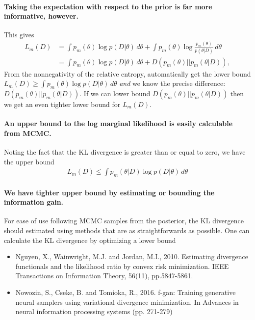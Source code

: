 \documentclass[10pt,a4paper]{article}
\begin{document}
\paragraph{Taking the expectation with respect to the prior is far more informative, however.} This gives
\begin{align}
L_m(D) &=\int  p_m(\theta) \log p(D | \theta) \, d\theta + \int  p_m(\theta) \log \frac{p_m(\theta)}{p(\theta | D)} \, d\theta \\
&= \int  p_m(\theta) \log p(D | \theta) \, d\theta + D(p_m(\theta) || p_m(\theta | D) ),
\end{align}
From the nonnegativity of the relative entropy, automatically get the lower bound $L_m(D) \geq \int  p_m(\theta) \log p(D | \theta) \, d\theta$ \emph{and} we know the precise difference: $ D(p_m(\theta) || p_m(\theta | D) )$. If we can lower bound $ D(p_m(\theta) || p_m(\theta | D) )$ then we get an even tighter lower bound for $L_m(D)$.

\paragraph{An upper bound to the log marginal likelihood is easily calculable from MCMC.}  Noting the fact that the KL divergence is greater than or equal to zero, we have the upper bound
\begin{align}
L_m(D) \leq \int  p_m(\theta | D) \log p(D | \theta) \, d\theta
\end{align}

\paragraph{We have tighter upper bound by estimating or bounding the information gain.}
For ease of use following MCMC samples from the posterior, the KL divergence should estimated using methods that are as straightforwards as possible. One can calculate the KL divergence by optimizing a lower bound
\begin{itemize}
\item Nguyen, X., Wainwright, M.J. and Jordan, M.I., 2010. Estimating divergence functionals and the likelihood ratio by convex risk minimization. IEEE Transactions on Information Theory, 56(11), pp.5847-5861.
\item Nowozin, S., Cseke, B. and Tomioka, R., 2016. f-gan: Training generative neural samplers using variational divergence minimization. In Advances in neural information processing systems (pp. 271-279)
\end{itemize}
\end{document}
